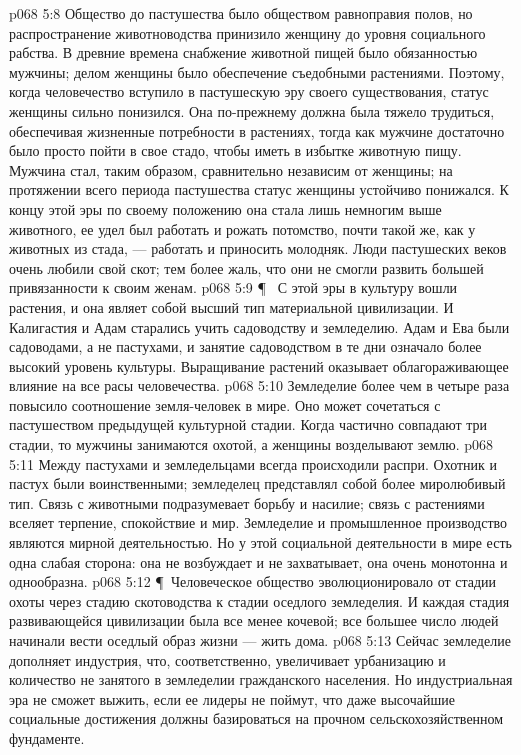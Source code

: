 \vs p068 5:8 Общество до пастушества было обществом равноправия полов, но распространение животноводства принизило женщину до уровня социального рабства. В древние времена снабжение животной пищей было обязанностью мужчины; делом женщины было обеспечение съедобными растениями. Поэтому, когда человечество вступило в пастушескую эру своего существования, статус женщины сильно понизился. Она по\hyp{}прежнему должна была тяжело трудиться, обеспечивая жизненные потребности в растениях, тогда как мужчине достаточно было просто пойти в свое стадо, чтобы иметь в избытке животную пищу. Мужчина стал, таким образом, сравнительно независим от женщины; на протяжении всего периода пастушества статус женщины устойчиво понижался. К концу этой эры по своему положению она стала лишь немногим выше животного, ее удел был работать и рожать потомство, почти такой же, как у животных из стада, --- работать и приносить молодняк. Люди пастушеских веков очень любили свой скот; тем более жаль, что они не смогли развить большей привязанности к своим женам.
\vs p068 5:9 \P\ \bibnobreakspace {} С этой эры в культуру вошли растения, и она являет собой высший тип материальной цивилизации. И Калигастия и Адам старались учить садоводству и земледелию. Адам и Ева были садоводами, а не пастухами, и занятие садоводством в те дни означало более высокий уровень культуры. Выращивание растений оказывает облагораживающее влияние на все расы человечества.
\vs p068 5:10 Земледелие более чем в четыре раза повысило соотношение земля\hyp{}человек в мире. Оно может сочетаться с пастушеством предыдущей культурной стадии. Когда частично совпадают три стадии, то мужчины занимаются охотой, а женщины возделывают землю.
\vs p068 5:11 Между пастухами и земледельцами всегда происходили распри. Охотник и пастух были воинственными; земледелец представлял собой более миролюбивый тип. Связь с животными подразумевает борьбу и насилие; связь с растениями вселяет терпение, спокойствие и мир. Земледелие и промышленное производство являются мирной деятельностью. Но у этой социальной деятельности в мире есть одна слабая сторона: она не возбуждает и не захватывает, она очень монотонна и однообразна.
\vs p068 5:12 \P\ Человеческое общество эволюционировало от стадии охоты через стадию скотоводства к стадии оседлого земледелия. И каждая стадия развивающейся цивилизации была все менее кочевой; все большее число людей начинали вести оседлый образ жизни --- жить дома.
\vs p068 5:13 Сейчас земледелие дополняет индустрия, что, соответственно, увеличивает урбанизацию и количество не занятого в земледелии гражданского населения. Но индустриальная эра не сможет выжить, если ее лидеры не поймут, что даже высочайшие социальные достижения должны базироваться на прочном сельскохозяйственном фундаменте.
